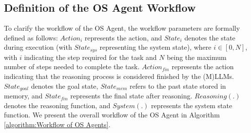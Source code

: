\subsection{Definition of the OS Agent Workflow}
\label{sec:Definition of OS Agents Workflow}
To clarify the workflow of the OS Agent, the workflow parameters are formally defined as follows: $Action_i$ represents the action, and $State_i$ denotes the state during execution (with $State_{sys}$ representing the system state), where $i \in [0, N]$, with $i$ indicating the step required for the task and $N$ being the maximum number of steps needed to complete the task. $Action_{fin}$ represents the action indicating that the reasoning process is considered finished by the (M)LLMs. $State_{goal}$ denotes the goal state, $State_{mem}$ refers to the past state stored in memory, and $State_{fin}$ represents the final state after reasoning. $Reasoning(.)$ denotes the reasoning function, and $System(.)$ represents the system state function. We present the overall workflow of the OS Agent in Algorithm \ref{algorithm:Workflow of OS Agents}. 






